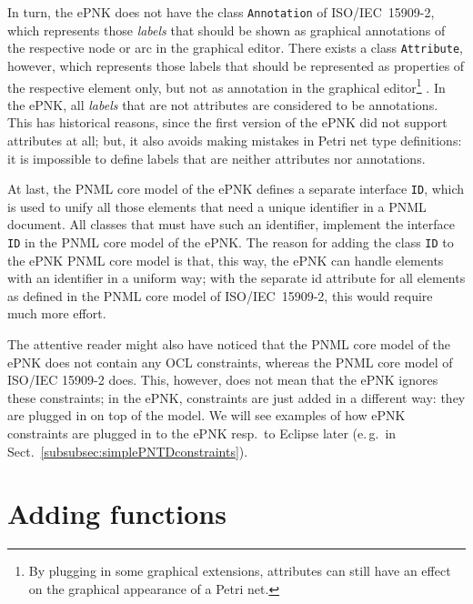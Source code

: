 In turn, the ePNK does not have the class {\tt Annotation}%
of ISO/IEC~15909-2, which represents those \emph{labels}%
that should be shown as graphical annotations
of the respective node or arc in the graphical editor. There exists a
class {\tt Attribute},%
however, which represents those labels that
should be represented as properties of the respective element only,
but not as annotation in the graphical editor\footnote
 {By plugging in some graphical extensions, attributes can still have an effect
  on the graphical appearance of a Petri net.}%
. In the ePNK, all \emph{labels}%
that are not attributes are considered to be
annotations. This has historical reasons, since the first version of the
ePNK did not support attributes at all; but, it also avoids making mistakes
in Petri net type definitions: it is impossible to define labels
that are neither attributes nor annotations.

At last, the PNML core model of the ePNK defines a separate interface {\tt ID},%
which is used to unify all those elements that need a unique identifier in a
PNML document. All classes that must have such an identifier, implement the
interface {\tt ID} in the PNML core model of the ePNK. The reason for adding
the class {\tt ID} to the ePNK PNML core model is that, this way, the ePNK can
handle elements with an identifier in a uniform way; with the separate
id attribute for all elements as defined in the PNML core model of
ISO/IEC~15909-2, this would require much more effort.%
  
The attentive reader might also have noticed that the PNML core model of the
ePNK does not contain any OCL constraints, whereas the PNML core model
of ISO/IEC 15909-2 does. This, however, does not mean that the ePNK ignores
these constraints; in the ePNK, constraints are just added in a different way:
they are plugged in on top of the model. We will see examples of
how ePNK constraints are plugged in to the ePNK resp.\ to Eclipse later
(e.\,g.\ in Sect.~\ref{subsubsec:simplePNTDconstraints}).

\section{Adding functions}  
\label{sec:adding-functions}

